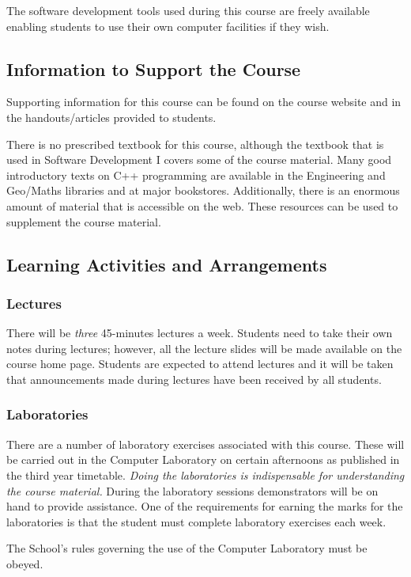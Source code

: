 \documentclass[11pt]{eie-cbo}
\begin{document}
The software development tools used during this course are freely available enabling students to use their own computer facilities if they wish. 

\subsection{Information to Support the Course}
Supporting information for this course can be found on the course website and in the handouts/articles provided to students.

There is no prescribed textbook for this course, although the textbook that is used in Software Development I covers some of the course material. Many good introductory texts on C++ programming are available in the Engineering and \mbox{Geo/Maths} libraries and at major bookstores. Additionally, there is an enormous amount of material that is accessible on the web. These resources can be used to supplement the course material.

\subsection{Learning Activities and Arrangements}

\subsubsection{Lectures}
There will be \emph{three} 45-minutes lectures a week. Students need to take their own notes during lectures; however, all the lecture slides will be made available on the course home page. Students are expected to attend lectures and it will be taken that announcements made during lectures have been received by all students.

\subsubsection{Laboratories}
There are a number of laboratory exercises associated with this course. These
will be carried out in the Computer Laboratory on certain afternoons as published in the third year timetable.  \emph{Doing the laboratories is indispensable for understanding the course material.} During the laboratory sessions demonstrators will be on hand to provide assistance. One of the requirements for earning the marks for the laboratories is that the student must complete laboratory exercises each week. 

The School's rules governing the use of the Computer Laboratory must be obeyed.
\end{document}
